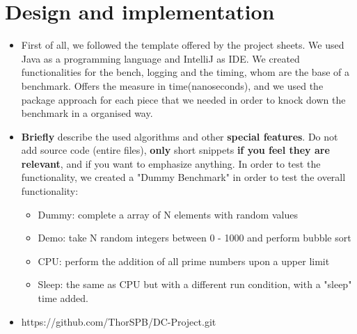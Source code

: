 \chapter{Design and implementation} 

\begin{itemize}
  \item  First of all, we followed the template offered by the project sheets. We used Java as a programming language and IntelliJ as IDE. We created functionalities for the bench, logging and the timing, whom are the base of a benchmark. Offers the measure in time(nanoseconds), and we used the package approach for each piece that we needed in order to knock down the benchmark in a organised way.
  
  \item \textbf{Briefly} describe the used algorithms and other \textbf{special features}. Do not add source code (entire files), \textbf{only} short snippets \textbf{if you feel they are relevant}, and if you want to emphasize anything. In order to test the functionality, we created a "Dummy Benchmark" in order to test the overall functionality:
  \begin{itemize}
      \item Dummy: complete a array of N elements with random values
      \item Demo: take N random integers between 0 - 1000 and perform bubble sort
      \item CPU: perform the addition of all prime numbers upon a upper limit
      \item Sleep: the same as CPU but with a different run condition, with a "sleep" time added.
  \end{itemize}

  \item https://github.com/ThorSPB/DC-Project.git
\end{itemize}